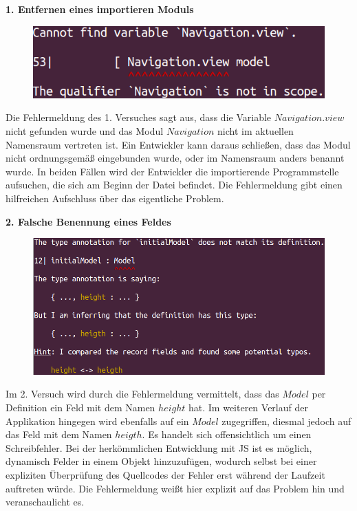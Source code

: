 \textbf{1. Entfernen eines importieren Moduls}\\
\begin{figure}[h!]
\centering
\includegraphics[scale=0.5]{img/import-error.png}
\end{figure}
Die Fehlermeldung des 1. Versuches sagt aus, dass die Variable $Navigation.view$ nicht gefunden wurde und das Modul $Navigation$ nicht im aktuellen Namensraum vertreten ist. Ein Entwickler kann daraus schließen, dass das Modul nicht ordnungsgemäß eingebunden wurde, oder im Namensraum anders benannt wurde. In beiden Fällen wird der Entwickler die importierende Programmstelle aufsuchen, die sich am Beginn der Datei befindet. Die Fehlermeldung gibt einen hilfreichen Aufschluss über das eigentliche Problem.


\textbf{2. Falsche Benennung eines Feldes}\\
\begin{figure}[h!]
\centering
\includegraphics[scale=0.4]{img/definition-error.png}
\end{figure}
Im 2. Versuch wird durch die Fehlermeldung vermittelt, dass das $Model$ per Definition ein Feld mit dem Namen $height$ hat. Im weiteren Verlauf der Applikation hingegen wird ebenfalls auf ein $Model$ zugegriffen, diesmal jedoch auf das Feld mit dem Namen $heigth$. Es handelt sich offensichtlich um einen Schreibfehler. Bei der herkömmlichen Entwicklung mit \ac{JS} ist es möglich, dynamisch Felder in einem Objekt hinzuzufügen, wodurch selbst bei einer expliziten Überprüfung des Quellcodes der Fehler erst während der Laufzeit auftreten würde. Die Fehlermeldung weißt hier explizit auf das Problem hin und veranschaulicht es.

